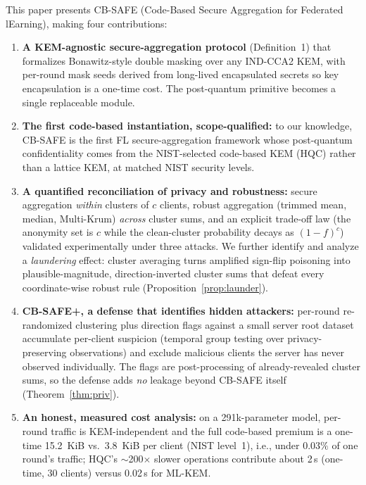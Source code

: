 \documentclass[conference]{IEEEtran}
\begin{document}
This paper presents CB-SAFE (Code-Based Secure Aggregation for Federated
lEarning), making four contributions:
\begin{enumerate}
\item \textbf{A KEM-agnostic secure-aggregation protocol} (Definition~1) that
formalizes Bonawitz-style double masking over any IND-CCA2 KEM, with per-round mask
seeds derived from long-lived encapsulated secrets so key encapsulation is a one-time
cost. The post-quantum primitive becomes a single replaceable module.
\item \textbf{The first code-based instantiation, scope-qualified:} to our knowledge,
CB-SAFE is the first FL secure-aggregation framework whose post-quantum
confidentiality comes from the NIST-selected code-based KEM (HQC) rather than a
lattice KEM, at matched NIST security levels.
\item \textbf{A quantified reconciliation of privacy and robustness:} secure
aggregation \emph{within} clusters of $c$ clients, robust aggregation (trimmed mean,
median, Multi-Krum) \emph{across} cluster sums, and an explicit trade-off law (the
anonymity set is $c$ while the clean-cluster probability decays as $(1-f)^c$)
validated experimentally under three attacks. We further identify and analyze a
\emph{laundering} effect: cluster averaging turns amplified sign-flip poisoning into
plausible-magnitude, direction-inverted cluster sums that defeat every
coordinate-wise robust rule (Proposition~\ref{prop:launder}).
\item \textbf{CB-SAFE+, a defense that identifies hidden attackers:} per-round
re-randomized clustering plus direction flags against a small server root dataset
accumulate per-client suspicion (temporal group testing over privacy-preserving
observations) and exclude malicious clients the server has never observed
individually. The flags are post-processing of already-revealed cluster sums, so the
defense adds \emph{no} leakage beyond CB-SAFE itself (Theorem~\ref{thm:priv}).
\item \textbf{An honest, measured cost analysis:} on a 291k-parameter model,
per-round traffic is KEM-independent and the full code-based premium is a one-time
15.2~KiB vs.\ 3.8~KiB per client (NIST level~1), i.e., under $0.03\%$ of one round's
traffic; HQC's $\sim$200$\times$ slower operations contribute about 2\,s (one-time,
30 clients) versus 0.02\,s for ML-KEM.
\end{enumerate}
\end{document}
